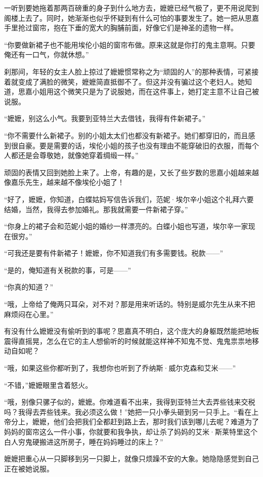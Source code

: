 \par 一听到要她拖着那两百磅重的身子到什么地方去，嬷嬷已经气极了，更不用说爬到阁楼上去了。同时，她渐渐也似乎怀疑到有什么可怕的事要发生了。她一把从思嘉手里抢过窗帘，抱在下垂的宽大的胸脯前面，好像它们是神圣的遗物一样。
\par “你要做新裙子也不能用埃伦小姐的窗帘布做。原来这就是你打的鬼主意啊。只要俺还有一口气，你就休想。”
\par 刹那间，年轻的女主人脸上掠过了嬷嬷惯常称之为“顽固的人”的那种表情，可紧接着就变成了满脸的微笑，嬷嬷简直抵御不了。但这并没有骗过这个老妇人。她知道，思嘉小姐用这个微笑只是为了说服她，而在这件事上，她打定主意不让自己被说服。
\par “嬷嬷，别这么小气。我要到亚特兰大去借钱，我得有件新裙子。”
\par “你不需要什么新裙子。别的小姐太太们也都没有新裙子。她们都穿旧的，而且感到很自豪。要是需要的话，埃伦小姐的孩子也没有理由不能穿破旧的衣服，而每个人都还是会尊敬她，就像她穿着绸缎一样。”
\par 顽固的表情又回到她脸上来了。上帝，有趣的是，又长了些岁数的思嘉小姐越来越像嘉乐先生，越来越不像埃伦小姐了！
\par “好了，嬷嬷，你知道，白蝶姑妈写信告诉我们，范妮·埃尔辛小姐这个礼拜六要结婚，当然，我得去参加婚礼。那我就需要一件新裙子穿。”
\par “你身上的裙子会和范妮小姐的婚纱一样漂亮的。白蝶小姐也写道，埃尔辛一家现在很穷。”
\par “可我还是要有件新裙子！嬷嬷，你不知道我们有多需要钱。税款——”
\par “是的，俺知道有关税款的事，可是——”
\par “你真的知道？”
\par “哦，上帝给了俺两只耳朵，对不对？那是用来听话的。特别是威尔先生从来不把麻烦闷在心里。”
\par 有没有什么嬷嬷没有偷听到的事呢？思嘉真不明白，这个庞大的身躯既然能把地板震得直摇晃，怎么在它的主人想偷听的时候就能这样神不知鬼不觉、鬼鬼祟祟地移动自如呢？
\par “哦，如果这些你都听到了，我想你也听到了乔纳斯·威尔克森和艾米——”
\par “不错，”嬷嬷眼里含着怒火。
\par “哦，别像只骡子似的，嬷嬷。你难道看不出来，我得到亚特兰大去弄些钱来交税吗？我得去弄些钱来。我必须这么做！”她把一只小拳头砸到另一只手上。“看在上帝分上，嬷嬷，他们会把我们全都赶到路上去，那时我们该到哪儿去呢？难道为了妈妈的窗帘这么一件小事，你就要和我争执，却让杀了妈妈的艾米·斯莱特里这个白人穷鬼硬搬进这所房子，睡在妈妈睡过的床上？”
\par 嬷嬷把重心从一只脚移到另一只脚上，就像只烦躁不安的大象。她隐隐感觉到自己正在被她说服。
